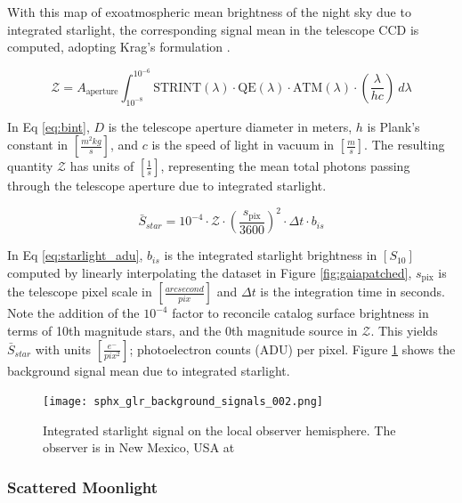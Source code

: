With this map of exoatmospheric mean brightness of the night sky due to integrated
starlight, the corresponding signal mean in the telescope CCD is computed, adopting Krag's formulation \cite{krag2003}.

\begin{equation} \label{eq:bint}
 \mathcal{Z} = A_\mathrm{aperture}
  \int_{10^{-8}}^{10^{-6}}{ \textrm{STRINT}(\lambda) \cdot \textrm{QE}(\lambda) \cdot \textrm{ATM}(\lambda)
  \cdot \left( \frac{\lambda}{h c} \right) \: d\lambda}  
\end{equation}

In Eq \ref{eq:bint}, $D$ is the telescope aperture diameter in meters, $h$ is Plank's constant in
$\left[ \frac{m^2 kg}{s} \right]$, and $c$
is the speed of light in vacuum in $\left[ \frac{m}{s} \right]$. The resulting quantity
$\mathcal{Z}$ has units of $\left[ \frac{1}{s} \right]$, representing the mean total photons passing
through the telescope aperture due to integrated starlight. 

\begin{equation} \label{eq:starlight_adu}
  \bar{S}_{star} = 10^{-4} \cdot \mathcal{Z} \cdot \left( \frac{s_\mathrm{pix}}{3600} \right)^2 \cdot \Delta t \cdot
  b_{is}
\end{equation}

In Eq \ref{eq:starlight_adu}, $b_{is}$ is the integrated starlight brightness in $\left[ S_{10}
\right]$ computed by linearly interpolating the dataset in Figure \ref{fig:gaiapatched}, $s_\mathrm{pix}$ is the telescope pixel scale in $\left[ \frac{arcsecond}{pix} \right]$ and $\Delta t$ is the integration time in seconds. Note the addition of the $10^{-4}$ factor to reconcile catalog surface brightness in terms of 10th magnitude stars, and the 0th magnitude source in $\mathcal{Z}$. This yields $\bar{S}_{star}$ with units $\left[ \frac{e^-}{pix^2} \right]$; photoelectron counts (ADU) per pixel. Figure \ref{fig:starlight_hemi} shows the background signal mean due to integrated starlight.

\begin{figure}[ht]
  \centering
  \texttt{[image: sphx\_glr\_background\_signals\_002.png]}
  \caption{Integrated starlight signal on the local observer hemisphere. The observer is in New Mexico, USA at
  \pogslla}
  \label{fig:starlight_hemi}
\end{figure}

\subsubsection{Scattered Moonlight}

